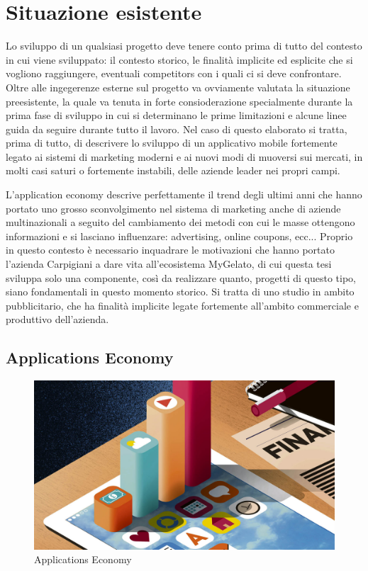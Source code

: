 \section{Situazione esistente}
Lo sviluppo di un qualsiasi progetto deve tenere conto prima di tutto del contesto in cui viene sviluppato: il contesto storico, le finalità implicite ed esplicite che si vogliono raggiungere, eventuali competitors con i quali ci si deve confrontare.
Oltre alle ingegerenze esterne sul progetto va ovviamente valutata la situazione preesistente, la quale va tenuta in forte consioderazione specialmente durante la prima fase di sviluppo in cui si determinano le prime limitazioni e alcune linee guida da seguire durante tutto il lavoro.
Nel caso di questo elaborato si tratta, prima di tutto, di descrivere lo sviluppo di un applicativo mobile fortemente legato ai sistemi di marketing moderni e ai nuovi modi di muoversi sui mercati, in molti casi saturi o fortemente instabili, delle aziende leader nei propri campi.

L'application economy descrive perfettamente il trend degli ultimi anni che hanno portato uno grosso sconvolgimento nel sistema di marketing anche di aziende multinazionali a seguito del cambiamento dei metodi con cui le masse ottengono informazioni e si lasciano influenzare: advertising, online coupons, ecc...
Proprio in questo contesto è necessario inquadrare le motivazioni che hanno portato l'azienda Carpigiani a dare vita all'ecosistema MyGelato, di cui questa tesi sviluppa solo una componente, così da realizzare quanto, progetti di questo tipo, siano fondamentali in questo momento storico.
Si tratta di uno studio in ambito pubblicitario, che ha finalità implicite legate fortemente all'ambito commerciale e produttivo dell'azienda.


\subsection{Applications Economy}
  
\begin{figure}[h!]
  \includegraphics[width=\linewidth]{images/The-App-Economy.jpg}
  \caption{Applications Economy}
  \label{fig:appEconomy1}
\end{figure}
  
